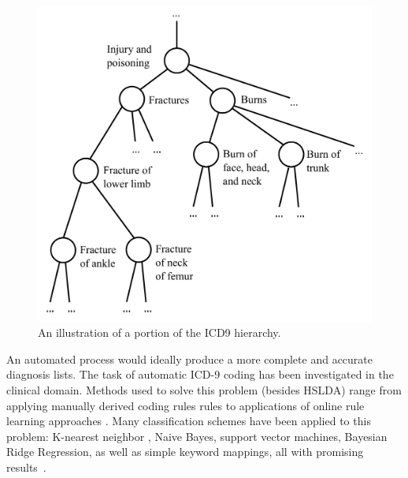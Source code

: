 \begin{figure}[t]
\centering \includegraphics[scale=0.4]{Chapters/chapter1/figures/hi_quality_ICD9_tree_cropped} \caption{An illustration of a portion of the ICD9 hierarchy.}
\label{fig:diagnosis_tree}
\end{figure}


An automated process would ideally produce a more complete and accurate
diagnosis lists. %
The task of automatic ICD-9 coding has been investigated in the clinical
domain.  Methods used to solve this problem (besides HSLDA) range from applying manually derived coding rules
rules to applications of online rule learning approaches \cite{Crammer2007,Goldstein2007,Farkas2008}.
Many classification schemes have been applied to this problem: K-nearest
neighbor , Naive Bayes, support vector machines, Bayesian Ridge Regression, as
well as simple keyword mappings, all with promising
results~\cite{LarkeyCroft95,RibeiroNeto2001,PakhomovEtAl06,Lita2008}.%


